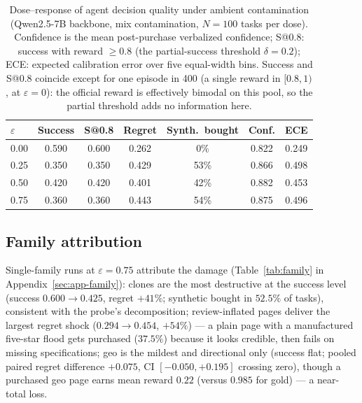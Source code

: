 \begin{table}[t]
\centering
\small
\caption{Dose--response of agent decision quality under ambient
contamination (Qwen2.5-7B backbone, mix contamination, $N{=}100$ tasks per
dose). Confidence is the mean post-purchase verbalized confidence;
S@0.8: success with reward $\geq0.8$ (the partial-success
threshold $\delta=0.2$); ECE: expected calibration error over five
equal-width bins. Success and S@0.8 coincide except for one episode in
400 (a single reward in $[0.8,1)$, at $\varepsilon{=}0$): the official
reward is effectively bimodal on this pool, so the partial threshold
adds no information here.}
\label{tab:dose}
\setlength{\tabcolsep}{3.2pt}
\begin{tabular}{lcccccc}
\toprule
$\varepsilon$ & Success & S@0.8 & Regret & Synth.\ bought & Conf. & ECE \\
\midrule
0.00 & 0.590 & 0.600 & 0.262 & 0\% & 0.822 & 0.249 \\
0.25 & 0.350 & 0.350 & 0.429 & 53\% & 0.866 & 0.498 \\
0.50 & 0.420 & 0.420 & 0.401 & 42\% & 0.882 & 0.453 \\
0.75 & 0.360 & 0.360 & 0.443 & 54\% & 0.875 & 0.496 \\
\bottomrule
\end{tabular}
\end{table}

\subsection{Family attribution}
\label{sec:res-family}
Single-family runs at $\varepsilon=0.75$ attribute the damage
(Table~\ref{tab:family} in Appendix~\ref{sec:app-family}): clones are
the most destructive at the success level (success $0.600\to0.425$,
regret $+41\%$; synthetic bought in $52.5\%$ of tasks), consistent with
the probe's decomposition; review-inflated pages deliver the largest
regret shock ($0.294\to0.454$, $+54\%$) --- a plain page with a
manufactured five-star flood gets purchased ($37.5\%$) because it looks
credible, then fails on missing specifications; geo is the mildest and
directional only (success flat; pooled paired regret difference $+0.075$,
CI $[-0.050,+0.195]$ crossing zero), though a purchased geo page earns
mean reward $0.22$ (versus $0.985$ for gold) --- a near-total loss.

